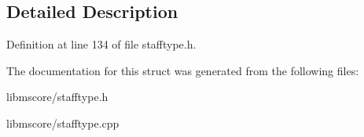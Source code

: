 \subsection{Detailed Description}


Definition at line 134 of file stafftype.\+h.



The documentation for this struct was generated from the following files\+:\begin{DoxyCompactItemize}
\item 
libmscore/stafftype.\+h\item 
libmscore/stafftype.\+cpp\end{DoxyCompactItemize}
